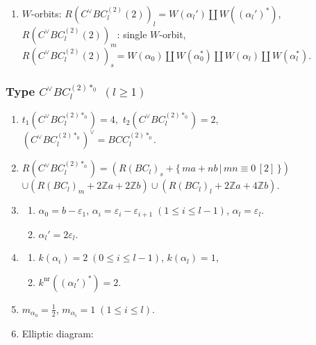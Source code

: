 \documentclass[11pt]{amsart}
\newcommand{\Z}{\mathbb{Z}}
\newcommand{\nr}{\mathrm{nr}}
\newcommand{\vep}{\varepsilon}
\begin{document}
{\begin{enumerate}
\begin{center}
{\begin{tikzpicture}[scale=0.9]
\end{tikzpicture}}
\end{center}
\item $W$-orbits: $R(C^\vee BC_l^{(2)}(2))_l=W(\alpha_l') \amalg W((\alpha_l')^\ast)$, \\
\phantom{$W$-orbits:}  $R(C^\vee BC_l^{(2)}(2))_m$: single $W$-orbit, \\
\phantom{$W$-orbits:} 
$R(C^\vee BC_l^{(2)}(2))_s=W(\alpha_0) \amalg W(\alpha_0^\ast)
\amalg W(\alpha_l) \amalg W(\alpha_l^\ast)$.
\end{enumerate}

\subsubsection{Type $C^\vee BC_l^{(2)\ast_0}$ $(l\geq 1)$}\label{data:CBC-4}
\begin{enumerate}
\item $t_1(C^\vee BC_l^{(2)\ast_0})=4,$ \quad $t_2(C^\vee BC_l^{(2)\ast_0})=2,$ \quad $(C^\vee BC_l^{(2)\ast_0})^\vee = BCC_l^{(2)\ast_0}.$
\item $R(C^\vee BC_l^{(2)\ast_0})=(R(BC_l)_s+\{\, ma+nb\, \vert\, mn \equiv 0\, [2]\, \})$ \\
 $\cup (R(BC_l)_m+2\Z a+2\Z b) \cup (R(BC_l)_l+2\Z a+4\Z b)$. 
\item 
\begin{enumerate}
\item[i)] $\alpha_0=b-\vep_1$, $\alpha_i=\vep_i-\vep_{i+1}\; 
(1\leq i\leq l-1)$, $\alpha_l=\vep_l$. 
\item[ii)] $\alpha_l'=2\vep_l$.
\end{enumerate}
\item 
\begin{enumerate}
\item[i)] $k(\alpha_i)=2\; 
(0\leq i\leq l-1)$, \; $k(\alpha_l)=1$, 
\item[ii)] $k^{\nr}((\alpha_l')^\ast)=2$. 
\end{enumerate}
\item $m_{\alpha_0}=\frac{1}{2}$, \; $m_{\alpha_i}=1\; (1\leq i\leq l)$.
\item Elliptic diagram:




\begin{center}
\end{center}
\end{enumerate}}
\end{document}
